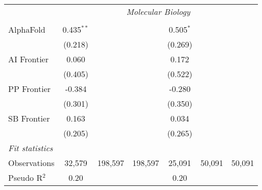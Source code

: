\begin{tabular}{lcccccc}
 & \multicolumn{6}{c}{\textit{Molecular Biology}} \\ \\
   AlphaFold    & 0.435$^{**}$ &         &         & 0.505$^{*}$ &        &   \\   
                & (0.218)      &         &         & (0.269)     &        &   \\   
   AI Frontier  & 0.060        &         &         & 0.172       &        &   \\   
                & (0.405)      &         &         & (0.522)     &        &   \\   
   PP Frontier  & -0.384       &         &         & -0.280      &        &   \\   
                & (0.301)      &         &         & (0.350)     &        &   \\   
   SB Frontier  & 0.163        &         &         & 0.034       &        &   \\   
                & (0.205)      &         &         & (0.265)     &        &   \\   
   \midrule
   \emph{Fit statistics}\\
   Observations & 32,579       & 198,597 & 198,597 & 25,091      & 50,091 & 50,091\\  
   Pseudo R$^2$ & 0.20         &         &         & 0.20        &        & \\  
   

\end{tabular}
